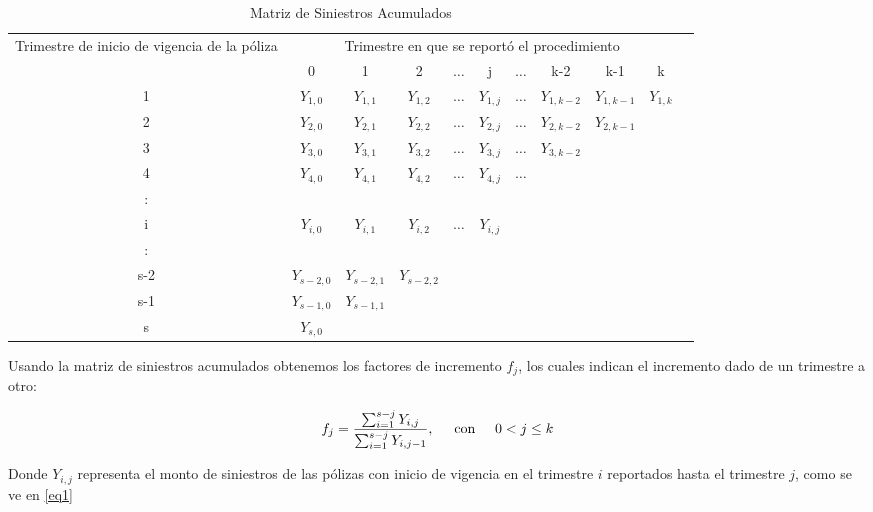 \documentclass[11pt,twoside,openright,spanish]{report}
\numberwithin{equation}{chapter}
\numberwithin{figure}{chapter}
\numberwithin{table}{chapter}
\begin{document}
	\begin{table}[ht]
	\centering
		\caption{Matriz de Siniestros Acumulados}
	\begin{tabularx}{\linewidth}{c|cccccccccc}
		\multirow{2}{4cm}{Trimestre de inicio de vigencia de la póliza}&\multicolumn{9}{c}{ Trimestre en que se reportó el procedimiento} \\
		& 0  & 1 & 2 & $ \dots $ & j & $\dots $ & k-2 & k-1 &  k \\
		\midrule
		1      &  $Y_{1,0}^{}$ & $Y_{1,1}^{}$ & $Y_{1,2}^{}$ & $ \dots $ & $Y_{1,j}^{}$ & $ \dots $ & $Y_{1,k-2}^{}$ & $Y_{1,k-1}^{}$ & $Y_{1,k}^{}$ \\
		2      &  $Y_{2,0}^{}$ & $Y_{2,1}^{}$ & $Y_{2,2}^{}$ & $ \dots $ & $Y_{2,j}^{}$ & $ \dots $ & $Y_{2,k-2}^{}$ & $Y_{2,k-1}^{}$ & \\
		3      &  $Y_{3,0}^{}$ & $Y_{3,1}^{}$ & $Y_{3,2}^{}$ & $ \dots $ & $Y_{3,j}^{}$ & $ \dots $ & $Y_{3,k-2}^{}$ & & \\
		4      &  $Y_{4,0}^{}$ & $Y_{4,1}^{}$ & $Y_{4,2}^{}$ & $ \dots $ & $Y_{4,j}^{}$ & $ \dots $ & & & \\
		:      & & & & & & & & &\\
		i      &  $Y_{i,0}^{}$ & $Y_{i,1}^{}$ & $Y_{i,2}^{}$ & $ \dots $ & $Y_{i,j}^{}$ & & & & \\
		:      & & & & & & & & & \\
		s-2      &  $Y_{s-2,0}^{}$ & $Y_{s-2,1}^{}$ & $Y_{s-2,2}^{}$ & & & & & & \\
		s-1      &  $Y_{s-1,0}^{}$ & $Y_{s-1,1}^{}$ & & & & & & & \\
		s      &  $Y_{s,0}^{}$ & & & & & & & & \\
	\end{tabularx}
	\end{table}
	
	Usando la matriz de siniestros acumulados obtenemos los factores de incremento ${f}_{j}$, los cuales indican el incremento dado de un trimestre a otro:

	\begin{equation}
	{f}_{j}=\frac{\sum _{i=1}^{s-j}{Y}_{i,j}}{\sum _{i=1}^{s-j}{Y}_{i,j-1}}, \hspace{0.5cm}\text{con}\hspace{0.5cm} 0< j\le k
	\label{eq1}
	\end{equation}

	Donde ${Y}_{i,j}$ representa el monto de siniestros de las pólizas con inicio de vigencia en el trimestre $i$ reportados hasta el trimestre $j$, como se ve en \eqref{eq1}
\end{document}
